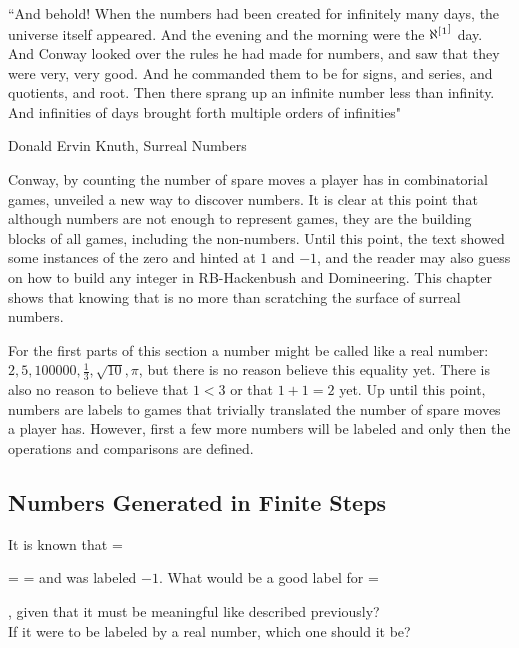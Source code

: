\epigraph{``And behold! When the numbers had been created for infinitely many days, the universe itself appeared. And the evening and the morning were the $\aleph^[\footnotemark^]$ day. And Conway looked over the rules he had made for numbers, and saw that they were very, very good. And he commanded them to be for signs, and series, and quotients, and root. Then there sprang up an infinite number less than infinity. And infinities of days brought forth multiple orders of infinities"}{Donald Ervin Knuth, Surreal Numbers \footnotemark}




Conway, by counting the number of spare moves a player has in combinatorial games, unveiled a new way to discover numbers. It is clear at this point that although numbers are not enough to represent games, they are the building blocks of all games, including the non-numbers. Until this point, the text showed some instances of the zero and hinted at $1$ and $-1$, and the reader may also guess on how to build any integer in RB-Hackenbush and Domineering. This chapter shows that knowing that is no more than scratching the surface of surreal numbers.

For the first parts of this section a number  might be called like a real number: $2, 5, 100000, \frac{1}{3}, \sqrt{10}, \pi$, but there is no reason believe this equality yet. There is also no reason to believe that $1 < 3$ or that $1 + 1 = 2$ yet. Up until this point, numbers are labels to games that trivially translated the number of spare moves a player has. However, first a few more numbers will be labeled and only then the operations and comparisons are defined.


\subsection*{Numbers Generated in Finite Steps}

It is known that \Gm{} =
 = \gam{}{\gam{}{}} =  and \Gm{} was labeled $-1$.
What would be a good label for \Hm = , given that it must be meaningful like described previously?\\ If it were to be labeled by a real number, which one should it be?

